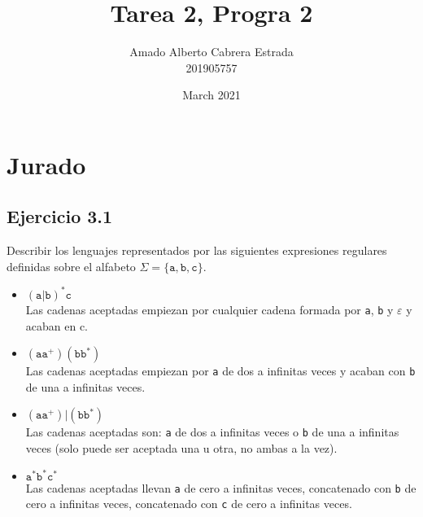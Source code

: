 \documentclass{article}
\title{Tarea 2, Progra 2}
\author{Amado Alberto Cabrera Estrada\\
201905757}
\date{March 2021}
\begin{document}
\maketitle

\section*{Jurado}
\subsection*{Ejercicio 3.1}
Describir los lenguajes representados por las siguientes expresiones regulares definidas sobre el alfabeto $\Sigma=\{\texttt{a},\texttt{b},\texttt{c}\}$.
\begin{itemize}
    \item $(\texttt{a}|\texttt{b})^*\texttt{c}$\\
    Las cadenas aceptadas empiezan por cualquier cadena formada por \texttt{a}, \texttt{b} y $\varepsilon$ y acaban en c.
    
    \item $(\texttt{aa}^+)(\texttt{bb}^*)$\\
    Las cadenas aceptadas empiezan por \texttt{a} de dos a infinitas veces y acaban con \texttt{b} de una a infinitas veces.
    
    \item $(\texttt{aa}^+)|(\texttt{bb}^*)$\\
    Las cadenas aceptadas son: \texttt{a} de dos a infinitas veces o \texttt{b} de una a infinitas veces (solo puede ser aceptada una u otra, no ambas a la vez).
    
    \item $\texttt{a}^*\texttt{b}^*\texttt{c}^*$\\
    Las cadenas aceptadas llevan \texttt{a} de cero a infinitas veces, concatenado con \texttt{b} de cero a infinitas veces, concatenado con \texttt{c} de cero a infinitas veces.
\end{itemize}
\end{document}
